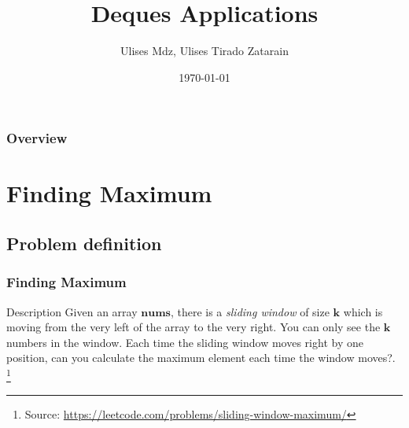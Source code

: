 \documentclass{beamer}
\title[Deques Applications]{Deques Applications} %
\author{Ulises Mdz, Ulises Tirado Zatarain} %
\institute[UTM] %
{
Algorist Weekly Talks \\ %
\medskip
\textit{ulisesmdzmtz@gmail.com}\\ %
\textit{ulises.tirado@cimat.mx} %
}
\date{\today} %
\begin{document}
\begin{frame}
\titlepage %
\end{frame}


\begin{frame}
\frametitle{Overview} %
\tableofcontents %
\end{frame}
\section{Finding Maximum}
\subsection{Problem definition}
\begin{frame}
\frametitle{Finding Maximum}

\begin{block}{Description}
Given an array $\mathbf{nums}$, there is a \textit{sliding window} of size $\mathbf{k}$ which is moving from the very left of the array to the very right. You can only see the $\mathbf{k}$ numbers in the window. Each time the sliding window moves right by one position, can you calculate the maximum element each time the window moves?.
\footnote{Source: \url{https://leetcode.com/problems/sliding-window-maximum/}}
\end{block}
\end{frame}
\end{document}
